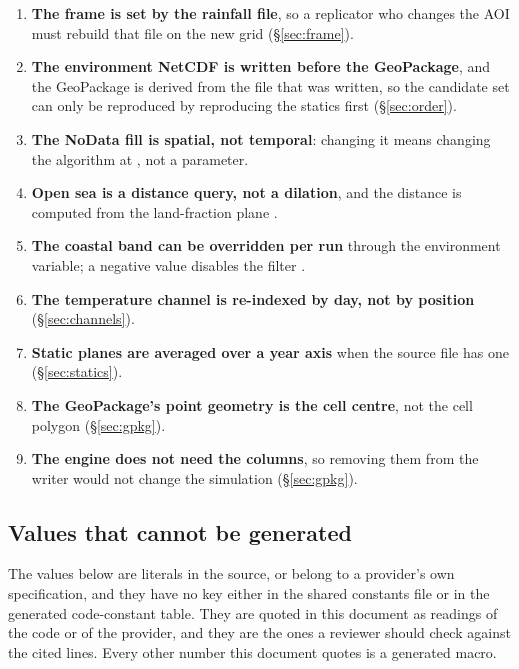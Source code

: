 \documentclass[11pt,a4paper]{article} \usepackage[utf8]{inputenc} \usepackage{lmodern} \usepackage[T1]{fontenc}
\begin{document}
\begin{enumerate}
\item \textbf{The frame is set by the rainfall file}, so a replicator who changes the AOI must
rebuild that file on the new grid (\S\ref{sec:frame}). 
\item \textbf{The environment NetCDF is
written before the GeoPackage}, and the GeoPackage is derived from the file that was written, so
the candidate set can only be reproduced by reproducing the statics first (\S\ref{sec:order}).
\item \textbf{The NoData fill is spatial, not temporal}: changing it means changing the
algorithm at , not a parameter. 
\item
\textbf{Open sea is a distance query, not a dilation}, and the distance is computed from the
land-fraction plane .
\item \textbf{The coastal band can be overridden per run} through the
 environment variable; a negative value disables the filter
. 
\item \textbf{The temperature channel
is re-indexed by day, not by position} (\S\ref{sec:channels}). 
\item \textbf{Static planes are
averaged over a year axis} when the source file has one (\S\ref{sec:statics}). 
\item \textbf{The
GeoPackage's point geometry is the cell centre}, not the cell polygon (\S\ref{sec:gpkg}). 
\item \textbf{The engine does
not need the  columns}, so removing them from the writer would not change the
simulation (\S\ref{sec:gpkg}).
\end{enumerate}

\subsection{Values that cannot be generated} \label{sec:literals}

The values below are literals in the source, or belong to a provider's own specification, and
they have no key either in the shared constants file or in the generated code-constant table.
They are quoted in this document as readings of the code or of the provider, and they are the
ones a reviewer should check against the cited lines. Every other number this document quotes
is a generated macro.
\end{document}

